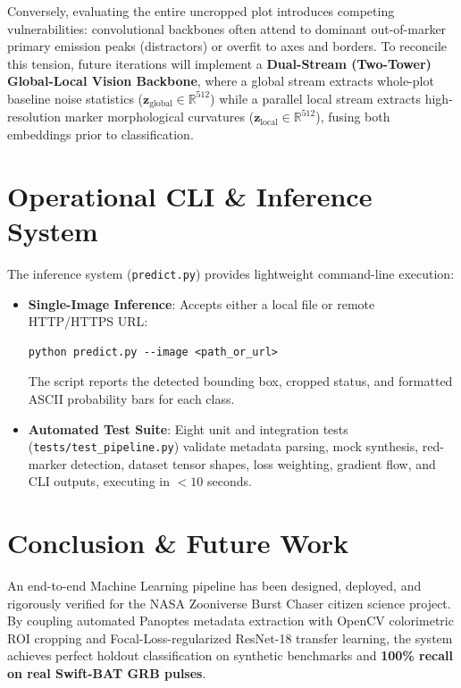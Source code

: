 \documentclass[10pt,twocolumn]{article}
\begin{document}
Conversely, evaluating the entire uncropped plot introduces competing vulnerabilities: convolutional backbones often attend to dominant out-of-marker primary emission peaks (distractors) or overfit to axes and borders. To reconcile this tension, future iterations will implement a \textbf{Dual-Stream (Two-Tower) Global-Local Vision Backbone}, where a global stream extracts whole-plot baseline noise statistics ($\mathbf{z}_{\text{global}} \in \mathbb{R}^{512}$) while a parallel local stream extracts high-resolution marker morphological curvatures ($\mathbf{z}_{\text{local}} \in \mathbb{R}^{512}$), fusing both embeddings prior to classification.

\section{Operational CLI \& Inference System}

The inference system (\texttt{predict.py}) provides lightweight command-line execution:
\begin{itemize}
    \item \textbf{Single-Image Inference}: Accepts either a local file or remote HTTP/HTTPS URL:
\begin{verbatim}
python predict.py --image <path_or_url>
\end{verbatim}
    The script reports the detected bounding box, cropped status, and formatted ASCII probability bars for each class.
    \item \textbf{Automated Test Suite}: Eight unit and integration tests (\texttt{tests/test\_pipeline.py}) validate metadata parsing, mock synthesis, red-marker detection, dataset tensor shapes, loss weighting, gradient flow, and CLI outputs, executing in $<10$ seconds.
\end{itemize}

\section{Conclusion \& Future Work}

An end-to-end Machine Learning pipeline has been designed, deployed, and rigorously verified for the NASA Zooniverse Burst Chaser citizen science project. By coupling automated Panoptes metadata extraction with OpenCV colorimetric ROI cropping and Focal-Loss-regularized ResNet-18 transfer learning, the system achieves perfect holdout classification on synthetic benchmarks and \textbf{100\% recall on real Swift-BAT GRB pulses}.
\end{document}
